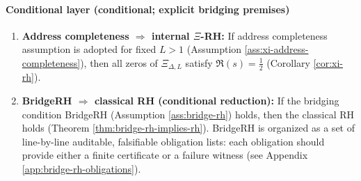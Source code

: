 \paragraph{Conditional layer (conditional; explicit bridging premises)}
\begin{enumerate}
  \item \textbf{Address completeness $\Rightarrow$ internal $\Xi$-RH:} If address completeness assumption is adopted for fixed $L>1$ (Assumption \ref{ass:xi-address-completeness}), then all zeros of $\Xi_{\Delta,L}$ satisfy $\Re(s)=\tfrac12$ (Corollary \ref{cor:xi-rh}).\par
  \item \textbf{BridgeRH $\Rightarrow$ classical RH (conditional reduction):} If the bridging condition BridgeRH (Assumption \ref{ass:bridge-rh}) holds, then the classical RH holds (Theorem \ref{thm:bridge-rh-implies-rh}). BridgeRH is organized as a set of line-by-line auditable, falsifiable obligation lists: each obligation should provide either a finite certificate or a failure witness (see Appendix \ref{app:bridge-rh-obligations}).\par
\end{enumerate}

